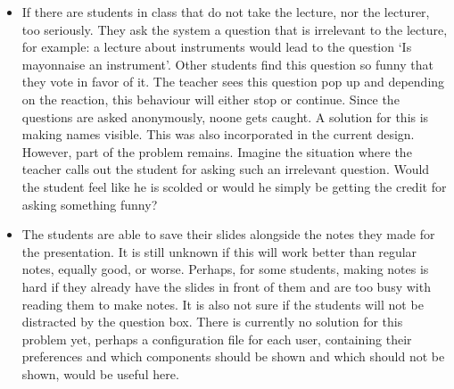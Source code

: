 \documentclass[11pt]{article}
\begin{document}
\begin{itemize}
\item If there are students in class that do not take the lecture, nor the lecturer, too seriously. They ask the system a question that is irrelevant to the lecture, for example: a lecture about instruments would lead to the question `Is mayonnaise an instrument'. Other students find this question so funny that they vote in favor of it. The teacher sees this question pop up and depending on the reaction, this behaviour will either stop or continue. Since the questions are asked anonymously, noone gets caught. A solution for this is making names visible. This was also incorporated in the current design. However, part of the problem remains. Imagine the situation where the teacher calls out the student for asking such an irrelevant question. Would the student feel like he is scolded or would he simply be getting the credit for asking something funny?

\item The students are able to save their slides alongside the notes they made for the presentation. It is still unknown if this will work better than regular notes, equally good, or worse. Perhaps, for some students, making notes is hard if they already have the slides in front of them and are too busy with reading them to make notes. It is also not sure if the students will not be distracted by the question box.  There is currently no solution for this problem yet, perhaps a configuration file for each user, containing their preferences and which components should be shown and which should not be shown, would be useful here. 
\end{itemize}
\end{document}
